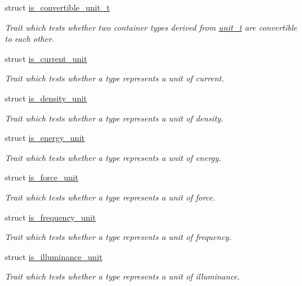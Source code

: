 \begin{DoxyCompactItemize}
struct \hyperlink{structunits_1_1traits_1_1is__convertible__unit__t}{is\+\_\+convertible\+\_\+unit\+\_\+t}
\begin{DoxyCompactList}\small\item\em Trait which tests whether two container types derived from {\ttfamily \hyperlink{classunits_1_1unit__t}{unit\+\_\+t}} are convertible to each other. \end{DoxyCompactList}\item 
struct \hyperlink{structunits_1_1traits_1_1is__current__unit}{is\+\_\+current\+\_\+unit}
\begin{DoxyCompactList}\small\item\em Trait which tests whether a type represents a unit of current. \end{DoxyCompactList}\item 
struct \hyperlink{structunits_1_1traits_1_1is__density__unit}{is\+\_\+density\+\_\+unit}
\begin{DoxyCompactList}\small\item\em Trait which tests whether a type represents a unit of density. \end{DoxyCompactList}\item 
struct \hyperlink{structunits_1_1traits_1_1is__energy__unit}{is\+\_\+energy\+\_\+unit}
\begin{DoxyCompactList}\small\item\em Trait which tests whether a type represents a unit of energy. \end{DoxyCompactList}\item 
struct \hyperlink{structunits_1_1traits_1_1is__force__unit}{is\+\_\+force\+\_\+unit}
\begin{DoxyCompactList}\small\item\em Trait which tests whether a type represents a unit of force. \end{DoxyCompactList}\item 
struct \hyperlink{structunits_1_1traits_1_1is__frequency__unit}{is\+\_\+frequency\+\_\+unit}
\begin{DoxyCompactList}\small\item\em Trait which tests whether a type represents a unit of frequency. \end{DoxyCompactList}\item 
struct \hyperlink{structunits_1_1traits_1_1is__illuminance__unit}{is\+\_\+illuminance\+\_\+unit}
\begin{DoxyCompactList}\small\item\em Trait which tests whether a type represents a unit of illuminance. \end{DoxyCompactList}\item 

\end{DoxyCompactItemize}

